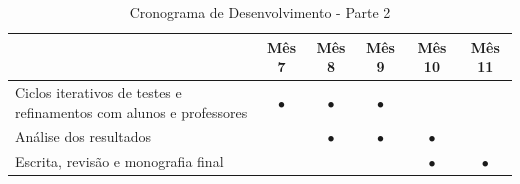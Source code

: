 \documentclass{abnt}
\begin{document}
\begin{table}[hb]
    \centering
    \begin{tabular}{ p{7.5cm} c c c c c }
        \toprule
                   & Mês 7 & Mês 8 & Mês 9 & Mês 10 & Mês 11 \\
        \midrule
            Ciclos iterativos de testes e refinamentos com alunos e professores
                   & $\bullet$ & $\bullet$ & $\bullet$ &  &  \\
        \midrule
           Análise dos resultados &  &$\bullet$& $\bullet$ & $\bullet$ & \\
        \midrule
           Escrita, revisão e monografia final &  & &  & $\bullet$ & $\bullet$
                   \\
        \bottomrule   
    \end{tabular}   
    \caption{Cronograma de Desenvolvimento - Parte 2}   
    \label{tab:cronograma-2-2}
\end{table}



\end{document}

